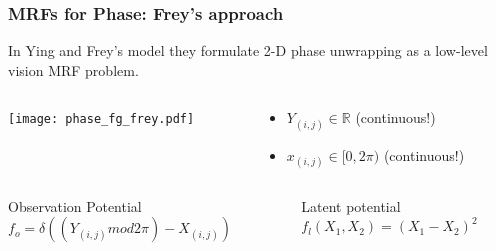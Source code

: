 \documentclass[compress]{beamer}
\begin{document}
\begin{frame} 
  \frametitle{MRFs for Phase: Frey's approach}
  In Ying and Frey's model \cite{lei_ying_unwrapping_2006} they formulate 2-D phase
  unwrapping as a low-level vision MRF problem. 
  
  \begin{columns}
    \begin{column}{5cm}
      \texttt{[image: phase\_fg\_frey.pdf]}
    \end{column}
    \begin{column}{5cm}
      \begin{itemize}
      \item $Y_{(i, j)} \in \mathbb{R}$ (continuous!) 
      \item $x_{(i, j)} \in [0, 2\pi)$ (continuous!) 
      \end{itemize}
    \end{column}
  \end{columns}
  
  
  \begin{columns}
    \begin{column}{5cm}
      \begin{block}{Observation Potential}
        $f_o = \delta ((Y_{(i, j)} mod 2\pi) - X_{(i, j)})$
      \end{block}
    \end{column}

    \begin{column}{5cm}
      \begin{block}{Latent potential} 
        $f_l(X_1, X_2) = (X_1 - X_2)^2$
      \end{block}
    \end{column}
    
  \end{columns}
  
\end{frame}
\end{document}
